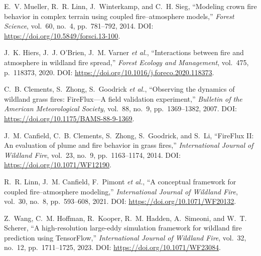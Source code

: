 \documentclass[conference]{IEEEtran}
\begin{document}
\begin{thebibliography}{00}
E.~V. Mueller, R.~R. Linn, J.~Winterkamp, and C.~H. Sieg,
``Modeling crown fire behavior in complex terrain using coupled fire--atmosphere models,''
\emph{Forest Science}, vol.~60, no.~4, pp.~781--792, 2014. DOI: \url{https://doi.org/10.5849/forsci.13-100}.

J.~K. Hiers, J.~J. O’Brien, J.~M. Varner \emph{et al.},
``Interactions between fire and atmosphere in wildland fire spread,''
\emph{Forest Ecology and Management}, vol.~475, p.~118373, 2020. DOI: \url{https://doi.org/10.1016/j.foreco.2020.118373}.

C.~B. Clements, S.~Zhong, S.~Goodrick \emph{et al.},
``Observing the dynamics of wildland grass fires: FireFlux---A field validation experiment,''
\emph{Bulletin of the American Meteorological Society}, vol.~88, no.~9, pp.~1369--1382, 2007. DOI: \url{https://doi.org/10.1175/BAMS-88-9-1369}.

J.~M. Canfield, C.~B. Clements, S.~Zhong, S.~Goodrick, and S.~Li,
``FireFlux II: An evaluation of plume and fire behavior in grass fires,''
\emph{International Journal of Wildland Fire}, vol.~23, no.~9, pp.~1163--1174, 2014. DOI: \url{https://doi.org/10.1071/WF12190}.

R.~R. Linn, J.~M. Canfield, F.~Pimont \emph{et al.},
``A conceptual framework for coupled fire--atmosphere modeling,''
\emph{International Journal of Wildland Fire}, vol.~30, no.~8, pp.~593--608, 2021. DOI: \url{https://doi.org/10.1071/WF20132}.

Z.~Wang, C.~M. Hoffman, R.~Kooper, R.~M. Hadden, A.~Simeoni, and W.~T. Scherer,
``A high-resolution large-eddy simulation framework for wildland fire prediction using TensorFlow,''
\emph{International Journal of Wildland Fire}, vol.~32, no.~12, pp.~1711--1725, 2023. DOI: \url{https://doi.org/10.1071/WF23084}.


\end{thebibliography}
\end{document}

